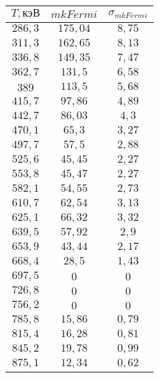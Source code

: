 \begin{tabular}{| c | c | c |}
    \hline
    $T, кэВ$ & $mkFermi$ & $\sigma_{mkFermi}$\\
    \hline
    $286,3$ & $175,04$ & $8,75$\\
    \hline
    $311,3$ & $162,65$ & $8,13$\\
    \hline
    $336,8$ & $149,35$ & $7,47$\\
    \hline
    $362,7$ & $131,5$ & $6,58$\\
    \hline
    $389$ & $113,5$ & $5,68$\\
    \hline
    $415,7$ & $97,86$ & $4,89$\\
    \hline
    $442,7$ & $86,03$ & $4,3$\\
    \hline
    $470,1$ & $65,3$ & $3,27$\\
    \hline
    $497,7$ & $57,5$ & $2,88$\\
    \hline
    $525,6$ & $45,45$ & $2,27$\\
    \hline
    $553,8$ & $45,47$ & $2,27$\\
    \hline
    $582,1$ & $54,55$ & $2,73$\\
    \hline
    $610,7$ & $62,54$ & $3,13$\\
    \hline
    $625,1$ & $66,32$ & $3,32$\\
    \hline
    $639,5$ & $57,92$ & $2,9$\\
    \hline
    $653,9$ & $43,44$ & $2,17$\\
    \hline
    $668,4$ & $28,5$ & $1,43$\\
    \hline
    $697,5$ & $0$ & $0$\\
    \hline
    $726,8$ & $0$ & $0$\\
    \hline
    $756,2$ & $0$ & $0$\\
    \hline
    $785,8$ & $15,86$ & $0,79$\\
    \hline
    $815,4$ & $16,28$ & $0,81$\\
    \hline
    $845,2$ & $19,78$ & $0,99$\\
    \hline
    $875,1$ & $12,34$ & $0,62$\\
    \hline
    \end{tabular}